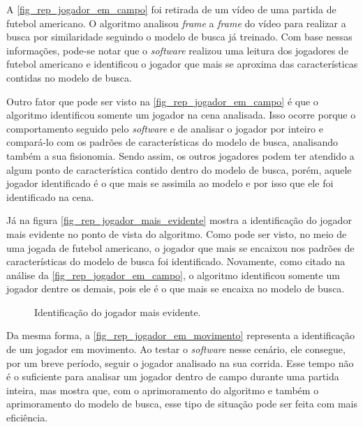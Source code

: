 A \autoref{fig_rep_jogador_em_campo} foi retirada de um vídeo de uma partida de futebol americano. O algoritmo analisou \textit{frame} a \textit{frame} do vídeo para realizar a busca por similaridade seguindo o modelo de busca já treinado. Com base nessas informações, pode-se notar que o \textit{software} realizou uma leitura dos jogadores de futebol americano e identificou o jogador que mais se aproxima das características contidas no modelo de busca.

Outro fator que pode ser visto na \autoref{fig_rep_jogador_em_campo} é que o algoritmo identificou somente um jogador na cena analisada. Isso ocorre porque o comportamento seguido pelo \textit{software} e de analisar o jogador por inteiro e compará-lo com os padrões de características do modelo de busca, analisando também a sua fisionomia. Sendo assim, os outros jogadores podem ter atendido a algum ponto de característica contido dentro do modelo de busca, porém, aquele jogador identificado é o que mais se assimila ao modelo e por isso que ele foi identificado na cena.

Já na figura \autoref{fig_rep_jogador_mais_evidente} mostra a identificação do jogador mais evidente no ponto de vista do algoritmo. Como pode ser visto, no meio de uma jogada de futebol americano, o jogador que mais se encaixou nos padrões de características do modelo de busca foi identificado. Novamente, como citado na análise da \autoref{fig_rep_jogador_em_campo}, o algoritmo identificou somente um jogador dentre os demais, pois ele é o que mais se encaixa no modelo de busca.

\begin{figure}[ht]
	\caption{\label{fig_rep_jogador_mais_evidente}Identificação do jogador mais evidente.}
	\begin{center}
	\end{center}
	\centering {}
\end{figure}

Da mesma forma, a \autoref{fig_rep_jogador_em_movimento} representa a identificação de um jogador em movimento. Ao testar o \textit{software} nesse cenário, ele consegue, por um breve período, seguir o jogador analisado na sua corrida. Esse tempo não é o suficiente para analisar um jogador dentro de campo durante uma partida inteira, mas mostra que, com o aprimoramento do algoritmo e também o aprimoramento do modelo de busca, esse tipo de situação pode ser feita com mais eficiência.

